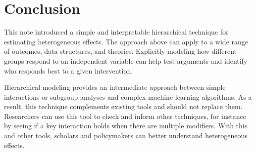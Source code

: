 \documentclass[12pt]{article}
\begin{document}
\section{Conclusion}

This note introduced a simple and interpretable hierarchical technique for estimating heterogeneous effects. 
The approach above can apply to a wide range of outcomes, data structures, and theories. 
Explicitly modeling how different groups respond to an independent variable can help test arguments and identify who responds best to a given intervention. 


Hierarchical modeling provides an intermediate approach between simple interactions or subgroup analyses and complex machine-learning algorithms. 
As a result, this technique complements existing tools and should not replace them. 
Researchers can use this tool to check and inform other techniques, for instance by seeing if a key interaction holds when there are multiple modifiers. 
With this and other tools, scholars and policymakers can better understand heterogeneous effects.


\singlespace
 
 


%
\end{document}
